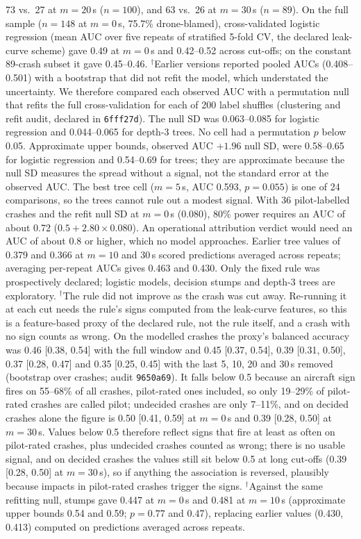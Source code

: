 \documentclass[preprint,12pt]{elsarticle}
\begin{document}
73 vs.\ 27 at $m=20$\,s ($n=100$), and 63 vs.\ 26 at $m=30$\,s ($n=89$). On the full sample ($n=148$ at $m=0$\,s, 75.7\% drone-blamed), cross-validated logistic regression (mean AUC over five repeats of stratified 5-fold CV, the declared leak-curve scheme) gave 0.49 at $m=0$\,s and 0.42--0.52 across cut-offs; on the constant 89-crash subset it gave 0.45--0.46. $^\dagger$Earlier versions reported pooled AUCs (0.408--0.501) with a bootstrap that did not refit the model, which understated the uncertainty. We therefore compared each observed AUC with a permutation null that refits the full cross-validation for each of 200 label shuffles (clustering and refit audit, declared in \texttt{6fff27d}). The null SD was 0.063--0.085 for logistic regression and 0.044--0.065 for depth-3 trees. No cell had a permutation $p$ below 0.05. Approximate upper bounds, observed AUC $+1.96$ null SD, were 0.58--0.65 for logistic regression and 0.54--0.69 for trees; they are approximate because the null SD measures the spread without a signal, not the standard error at the observed AUC. The best tree cell ($m=5$\,s, AUC 0.593, $p=0.055$) is one of 24 comparisons, so the trees cannot rule out a modest signal. With 36 pilot-labelled crashes and the refit null SD at $m=0$\,s (0.080), 80\% power requires an AUC of about 0.72 ($0.5 + 2.80 \times 0.080$). An operational attribution verdict would need an AUC of about 0.8 or higher, which no model approaches. Earlier tree values of 0.379 and 0.366 at $m=10$ and 30\,s scored predictions averaged across repeats; averaging per-repeat AUCs gives 0.463 and 0.430. Only the fixed rule was prospectively declared; logistic models, decision stumps and depth-3 trees are exploratory. $^\dagger$The rule did not improve as the crash was cut away. Re-running it at each cut needs the rule's signs computed from the leak-curve features, so this is a feature-based proxy of the declared rule, not the rule itself, and a crash with no sign counts as wrong. On the modelled crashes the proxy's balanced accuracy was 0.46 [0.38, 0.54] with the full window and 0.45 [0.37, 0.54], 0.39 [0.31, 0.50], 0.37 [0.28, 0.47] and 0.35 [0.25, 0.45] with the last 5, 10, 20 and 30\,s removed (bootstrap over crashes; audit \texttt{9650a69}). It falls below 0.5 because an aircraft sign fires on 55--68\% of all crashes, pilot-rated ones included, so only 19--29\% of pilot-rated crashes are called pilot; undecided crashes are only 7--11\%, and on decided crashes alone the figure is 0.50 [0.41, 0.59] at $m=0$\,s and 0.39 [0.28, 0.50] at $m=30$\,s. Values below 0.5 therefore reflect signs that fire at least as often on pilot-rated crashes, plus undecided crashes counted as wrong; there is no usable signal, and on decided crashes the values still sit below 0.5 at long cut-offs (0.39 [0.28, 0.50] at $m=30$\,s), so if anything the association is reversed, plausibly because impacts in pilot-rated crashes trigger the signs. $^\dagger$Against the same refitting null, stumps gave 0.447 at $m=0$\,s and 0.481 at $m=10$\,s (approximate upper bounds 0.54 and 0.59; $p=0.77$ and 0.47), replacing earlier values (0.430, 0.413) computed on predictions averaged across repeats.
\end{document}
